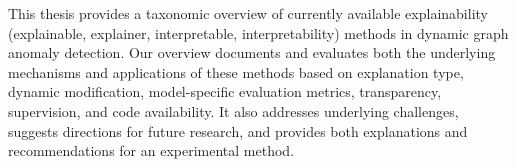 This thesis provides a taxonomic overview of currently available explainability (explainable, explainer, interpretable, interpretability) methods in dynamic graph anomaly detection. Our overview documents and evaluates both the underlying mechanisms and applications of these methods based on explanation type, dynamic modification, model-specific evaluation metrics, transparency, supervision, and code availability. It also addresses underlying challenges, suggests directions for future research, and provides both explanations and recommendations for an experimental method.

